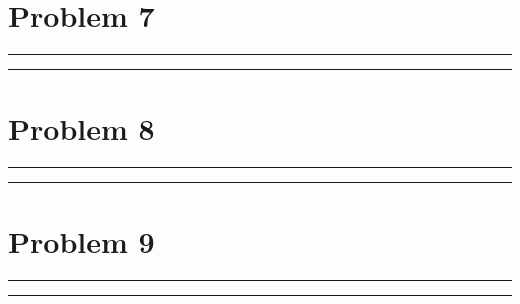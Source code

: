 \documentclass{article}
\theoremstyle{definition}
\newenvironment{solution}{\bigskip\hrule{\hfill}}{\bigskip\hrule{\hfill}} %
\begin{document}

\newpage


\section*{Problem 7}

\begin{solution}


\end{solution}


\newpage


\section*{Problem 8}

\begin{solution}


\end{solution}


\newpage


\section*{Problem 9}

\begin{solution}


\end{solution}
\end{document}
